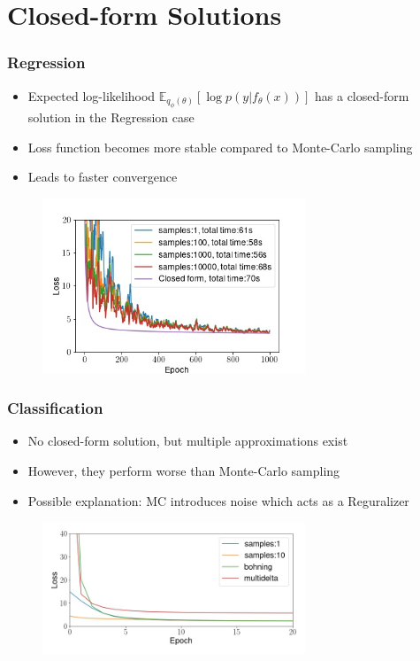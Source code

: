 \documentclass{beamer}
\begin{document}
        \section{Closed-form Solutions}
        \begin{frame}
            \frametitle{Regression}
            \begin{itemize}
                \item Expected log-likelihood $\mathbb{E}_{q_{\phi}(\theta)}[\log{p(y \vert f_{\theta}(x))}]$ has a closed-form solution in the Regression case
                \item Loss function becomes more stable compared to Monte-Carlo sampling
                \item Leads to faster convergence
            \end{itemize}
            \begin{figure}
                \includegraphics[width=0.7\textwidth]{images/Regression/CFvsMC.jpg}
            \end{figure}
        \end{frame}

        \begin{frame}
            \frametitle{Classification}
            \begin{itemize}
                \item No closed-form solution, but multiple approximations exist
                \item However, they perform worse than Monte-Carlo sampling
                \item Possible explanation: MC introduces noise which acts as a Reguralizer
            \end{itemize}
            \begin{figure}
                \includegraphics[width=0.7\textwidth]{images/Classification/CFvsMC.jpg}
            \end{figure}
        \end{frame}
        
\end{document}
